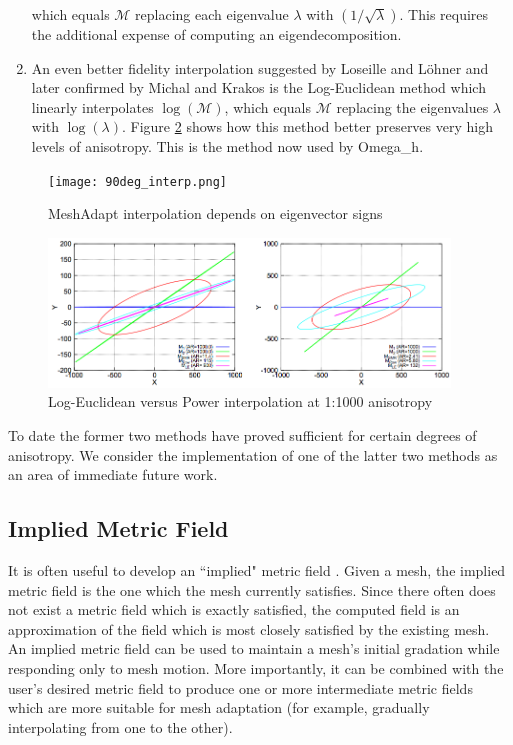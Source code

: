 \begin{enumerate}
which equals $\mathcal{M}$ replacing each eigenvalue $\lambda$
with $(1/\sqrt{\lambda})$.
This requires the additional expense of computing an eigendecomposition.
\item An even better fidelity interpolation suggested by Loseille and
L{\"o}hner \cite{loseille20093d} and later confirmed by
Michal and Krakos \cite{michal2012anisotropic} is the Log-Euclidean
method which linearly interpolates $\log(\mathcal{M})$, which equals
$\mathcal{M}$ replacing the eigenvalues $\lambda$ with $\log(\lambda)$.
Figure \ref{fig:log_interp} shows how this method better preserves
very high levels of anisotropy.
This is the method now used by Omega\_h.
\end{enumerate}

\begin{figure}
\begin{center}
\texttt{[image: 90deg\_interp.png]}
\caption{MeshAdapt interpolation depends on eigenvector signs}
\label{fig:90deg_interp}
\end{center}
\end{figure}

\begin{figure}
\begin{center}
\includegraphics[width=0.95\textwidth]{log_interp.png}
\caption{Log-Euclidean versus Power interpolation
at 1:1000 anisotropy \cite{michal2012anisotropic}}
\label{fig:log_interp}
\end{center}
\end{figure}

To date the former two methods have proved sufficient for certain
degrees of anisotropy.
We consider the implementation of one
of the latter two methods as an area of immediate future work.

\subsection{Implied Metric Field}
\label{sec:ident_metric}

It is often useful to develop an ``implied" metric field
\cite{michal2012anisotropic}.
Given a mesh, the implied metric field is the one which the mesh
currently satisfies.
Since there often does not exist a metric field which is exactly
satisfied, the computed field is an approximation of the field
which is most closely satisfied by the existing mesh.
An implied metric field can be used to maintain a mesh's
initial gradation while responding only to mesh motion.
More importantly, it can be combined with the user's desired
metric field to produce one or more intermediate metric fields
which are more suitable for mesh adaptation
(for example, gradually interpolating from one to the other).

